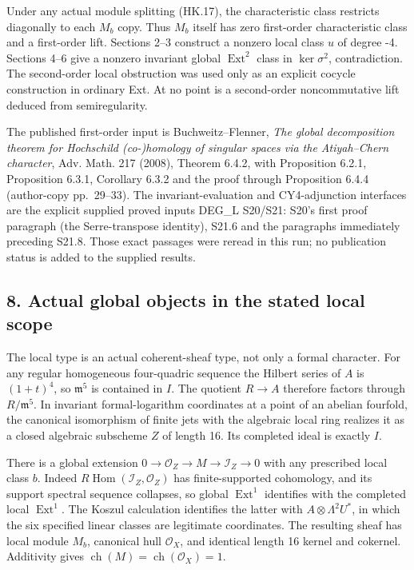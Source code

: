 Under any actual module splitting (HK.17), the characteristic
class restricts diagonally to each \(M_b\) copy. Thus \(M_b\) itself has
zero first-order characteristic class and a first-order lift.
Sections 2--3 construct a nonzero local class \(u\) of degree -4.
Sections 4--6 give a nonzero invariant global \(\operatorname{Ext}^2\) class in \(\ker\sigma^2\),
contradiction. The second-order local obstruction was used only
as an explicit cocycle construction in ordinary Ext. At no point
is a second-order noncommutative lift deduced from semiregularity.

The published first-order input is Buchweitz--Flenner,
\emph{The global decomposition theorem for Hochschild (co-)homology of
singular spaces via the Atiyah--Chern character}, Adv. Math. 217 (2008),
Theorem 6.4.2, with Proposition 6.2.1, Proposition 6.3.1, Corollary 6.3.2
and the proof through Proposition 6.4.4 (author-copy pp.~29--33).\cite{SF-BF2008}
The invariant-evaluation and CY4-adjunction interfaces are the
explicit supplied proved inputs DEG\_L S20/S21: S20's first proof
paragraph (the Serre-transpose identity), S21.6 and the paragraphs
immediately preceding S21.8. Those exact passages were reread in
this run; no publication status is added to the supplied results.

\subsection{8. Actual global objects in the stated local scope}\label{SF-E846:s8}

The local type is an actual coherent-sheaf type, not only a
formal character. For any regular homogeneous four-quadric
sequence the Hilbert series of \(A\) is \((1+t)^4\), so \(\mathfrak m^5\) is contained
in \(I\). The quotient \(R\to A\) therefore factors through \(R/\mathfrak m^5\). In
invariant formal-logarithm coordinates at a point of an abelian
fourfold, the canonical isomorphism of finite jets with the
algebraic local ring realizes it as a closed algebraic subscheme
\(Z\) of length 16. Its completed ideal is exactly \(I\).

There is a global extension
\(0\to\mathcal O_Z\to M\to\mathcal I_Z\to0\) with any prescribed local class \(b\). Indeed
\(R\operatorname{Hom}(\mathcal I_Z,\mathcal O_Z)\) has finite-supported cohomology, and its support
spectral sequence collapses, so global \(\operatorname{Ext}^1\) identifies with the
completed local \(\operatorname{Ext}^1\). The Koszul calculation identifies the latter
with \(A\otimes\Lambda^2U^*\), in which the six specified linear classes
are legitimate coordinates. The resulting sheaf has local module
\(M_b\), canonical hull \(\mathcal O_X\), and identical length 16 kernel and
cokernel. Additivity gives \(\operatorname{ch}(M)=\operatorname{ch}(\mathcal O_X)=1\).


